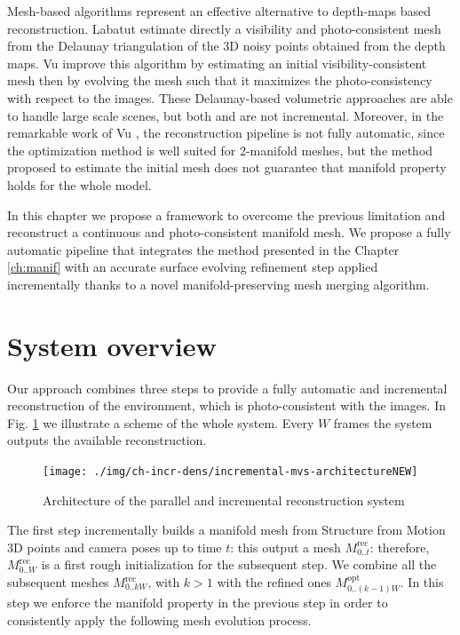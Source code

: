 Mesh-based algorithms represent an effective alternative to depth-maps based reconstruction. Labatut \etal \cite{labatut2007efficient} estimate directly a visibility and photo-consistent mesh from the Delaunay triangulation of the 3D noisy points obtained from the depth maps.
Vu \etal  \cite{vu_et_al_2012} improve this algorithm by estimating an initial visibility-consistent mesh then by evolving the mesh such that it maximizes the photo-consistency with respect to the images. 
These Delaunay-based volumetric approaches are able to handle large scale scenes, but both \cite{labatut2007efficient} and \cite{vu_et_al_2012}  are not incremental.
Moreover, in the remarkable work of Vu \etal \cite{vu_et_al_2012}, the reconstruction pipeline   is not fully automatic, since the optimization method is well suited for 2-manifold meshes, but the method proposed to estimate the initial mesh does not guarantee that manifold property holds for the whole model.



In this chapter we propose a framework to overcome the previous limitation and reconstruct a continuous and photo-consistent manifold mesh. 
We propose a fully automatic pipeline that integrates the method presented in the Chapter \ref{ch:manif}  with an accurate surface evolving refinement step applied incrementally thanks to a novel manifold-preserving mesh merging algorithm.


\section{System overview}
 Our approach combines three steps  to provide a fully automatic and incremental reconstruction of the environment, which is photo-consistent with the images. In Fig. \ref{fig:architecture} we illustrate a scheme of the whole system. Every  $W$ frames the system outputs the available reconstruction.
 
 \begin{figure}[t]
  \centering
  \texttt{[image: ./img/ch-incr-dens/incremental-mvs-architectureNEW]}
  \caption{Architecture of the parallel and incremental reconstruction system}
  \label{fig:architecture}
\end{figure}


The first step  incrementally builds a manifold mesh  from Structure from Motion 3D points and camera poses up to time $t$: this output a mesh $\mathit{M}_{0..t}^{\text{rec}}$: therefore,  $\mathit{M}_{0..W}^{\text{rec}}$ is a first rough initialization for the subsequent step. We combine all the subsequent meshes $\mathit{M}_{0..kW}^{\text{rec}}$, with $k>1$ with the refined ones $\mathit{M}_{0..(k-1)W}^{\text{opt}}$. 
In this step we enforce the manifold property in the previous step in order to consistently apply the following mesh evolution process.


